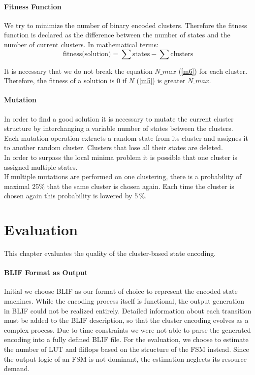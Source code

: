 \subsubsection{Fitness Function}
\label{subsubsec:FitnessFunction}

We try to minimize the number of binary encoded clusters. Therefore the fitness function is declared as the difference between the number of states and the number of current clusters. In mathematical terms: 
\begin{equation}
\text{fitness(solution)} = \sum{\text{states}} - \sum{\text{clusters}}
\end{equation}

It is necessary that we do not break the equation  $N\_max$ (\ref{m6}) for each cluster. Therefore, the fitness of a solution is 0 if $ N $ (\ref{m5}) is greater $N\_max$.

\subsubsection{Mutation}
\label{subsubsec:Mutation}

In order to find a good solution it is necessary to mutate the current cluster structure by interchanging a variable number of states between the clusters. \\
Each mutation operation extracts a random state from its cluster and assignes it to another random cluster. Clusters that lose all their states are deleted. \\
In order to surpass the local minima problem it is possible that one cluster is assigned multiple states.\\
If multiple mutations are performed on one clustering, there is a probability of maximal 25\% that the same cluster is chosen again. Each time the cluster is chosen again this probability is lowered by 5\,\%.


\chapter{Evaluation}
\label{cha:Evaluation}

This chapter evaluates the quality of the cluster-based state encoding.

\subsubsection{BLIF Format as Output}
\label{subsubsec:BLIFOutput}

Initial we choose BLIF as our format of choice to represent the encoded state machines. While the encoding process itself is functional, the output generation in BLIF could not be realized entirely. Detailed information about each transition must be added to the BLIF description, so that the cluster encoding evolves as a complex process.
Due to time constraints we were not able to parse the generated encoding into a fully defined BLIF file. For the evaluation, we choose to estimate the number of LUT and fliflops based on the structure of the FSM instead. Since the output logic of an FSM is not dominant, the estimation neglects its resource demand.

